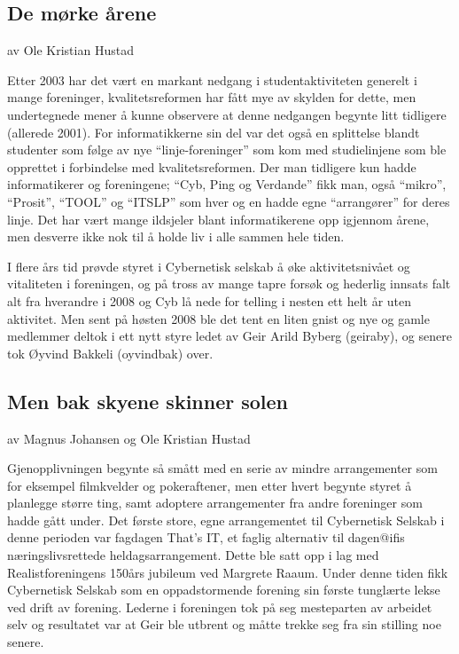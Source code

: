 \documentclass[../main.tex]{subfiles}
\begin{document}
\subsection{De mørke årene}
av Ole Kristian Hustad

Etter 2003 har det vært en markant nedgang i studentaktiviteten generelt i mange foreninger, kvalitetsreformen har fått mye av skylden for dette, men undertegnede mener å kunne observere at denne nedgangen begynte litt tidligere (allerede 2001). For informatikkerne sin del var det også en splittelse blandt studenter som følge av nye “linje-foreninger” som kom med studielinjene som ble opprettet i forbindelse med kvalitetsreformen. Der man tidligere kun hadde informatikerer og foreningene;  “Cyb, Ping og Verdande” fikk man, også “mikro”, “Prosit”,  “TOOL” og “ITSLP” som hver og en hadde egne “arrangører” for deres linje. Det har vært mange ildsjeler blant informatikerene opp igjennom årene, men desverre ikke nok til å holde liv i alle sammen hele tiden.

I flere års tid prøvde styret i Cybernetisk selskab å øke aktivitetsnivået og vitaliteten i foreningen, og på tross av mange tapre forsøk og hederlig innsats falt alt fra hverandre i 2008 og Cyb lå nede for telling i nesten ett helt år uten aktivitet. Men sent på høsten 2008 ble det tent en liten gnist og nye og gamle medlemmer deltok i ett nytt styre ledet av Geir Arild Byberg (geiraby), og senere tok Øyvind Bakkeli (oyvindbak) over.

\subsection{Men bak skyene skinner solen}
av Magnus Johansen og Ole Kristian Hustad

Gjenopplivningen begynte så smått med en serie av mindre arrangementer som for eksempel filmkvelder og pokeraftener, men etter hvert begynte styret å planlegge større ting, samt adoptere arrangementer fra andre foreninger som hadde gått under. Det første store, egne arrangementet til Cybernetisk Selskab i denne perioden var fagdagen That's IT, et faglig alternativ til dagen@ifis næringslivsrettede heldagsarrangement. Dette ble satt opp i lag med Realistforeningens 150års jubileum ved Margrete Raaum. Under denne tiden fikk Cybernetisk Selskab som en oppadstormende forening sin første tunglærte lekse ved drift av forening. Lederne i foreningen tok på seg mesteparten av arbeidet selv og resultatet var at Geir ble utbrent og måtte trekke seg fra sin stilling noe senere.
\end{document}
